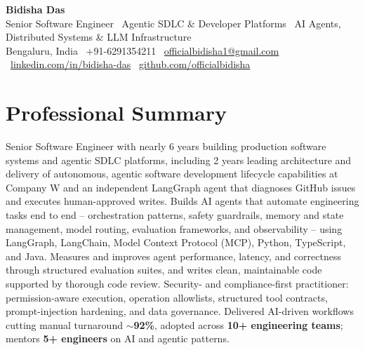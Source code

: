 \documentclass[10.5pt,letterpaper]{article}
\begin{document}
\begin{center}
    {\LARGE \textbf{Bidisha Das}}\\[2pt]
    Senior Software Engineer \textbar\ Agentic SDLC \& Developer Platforms \textbar\ AI Agents, Distributed Systems \& LLM Infrastructure\\[2pt]
    Bengaluru, India \textbar\ +91-6291354211 \textbar\ \href{mailto:officialbidisha1@gmail.com}{officialbidisha1@gmail.com} \textbar\
    \href{https://linkedin.com/in/bidisha-das/}{linkedin.com/in/bidisha-das} \textbar\
    \href{https://github.com/officialbidisha}{github.com/officialbidisha}
\end{center}

\section*{Professional Summary}
Senior Software Engineer with nearly 6 years building production software systems and agentic SDLC platforms, including 2 years leading architecture and delivery of autonomous, agentic software development lifecycle capabilities at Company W and an independent LangGraph agent that diagnoses GitHub issues and executes human-approved writes. Builds AI agents that automate engineering tasks end to end -- orchestration patterns, safety guardrails, memory and state management, model routing, evaluation frameworks, and observability -- using LangGraph, LangChain, Model Context Protocol (MCP), Python, TypeScript, and Java. Measures and improves agent performance, latency, and correctness through structured evaluation suites, and writes clean, maintainable code supported by thorough code review. Security- and compliance-first practitioner: permission-aware execution, operation allowlists, structured tool contracts, prompt-injection hardening, and data governance. Delivered AI-driven workflows cutting manual turnaround \textbf{$\sim$92\%}, adopted across \textbf{10+ engineering teams}; mentors \textbf{5+ engineers} on AI and agentic patterns.

\end{document}

